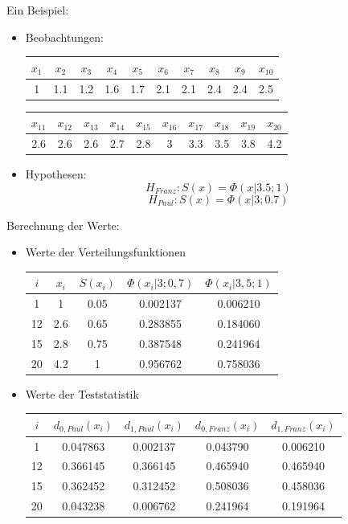 \documentclass{beamer}
\begin{document}
\begin{frame}{\insertsubsection}
Ein Beispiel:\\
	\begin{itemize}
		\item Beobachtungen:
			\begin{table}[h]
			\center
			\begin{tabular}{c|c|c|c|c|c|c|c|c|c}
			$x_1$	&$x_2$	&$x_3$	&$x_4$	&$x_5$	&$x_6$	&$x_7$	&$x_8$	&$x_9$	&$x_{10}$\\
			\hline
			1	&1.1	&1.2	&1.6	&1.7	&2.1	&2.1	&2.4	&2.4	&2.5	\\
			\end{tabular}
			\begin{tabular}{c|c|c|c|c|c|c|c|c|c}
			$x_{11}$	&$x_{12}$	&$x_{13}$	&$x_{14}$	&$x_{15}$	&$x_{16}$	&$x_{17}$	&$x_{18}$	&$x_{19}$	&$x_{20}$\\
			\hline
			2.6	&2.6	&2.6	&2.7	&2.8	&3	&3.3	&3.5	&3.8	&4.2\\
			\end{tabular}
			\end{table}
		\item Hypothesen: $$H_{Franz}:S(x)=\Phi(x|3.5;1)$$ $$H_{Paul}:S(x)=\Phi(x|3;0.7)$$
	\end{itemize}
\end{frame}

\begin{frame}{\insertsubsection}
Berechnung der Werte:\\
	\begin{itemize}
		\item Werte der Verteilungsfunktionen
			\begin{table}[ht]
			\center
			\begin{tabular}{c|c|c|c|c}
			$i$ 	& $x_i$ 	& $S(x_i)$ 	& $\Phi (x_i|3;0,7)$ 	& $\Phi (x_i|3,5;1)$ 	\\
			\hline
			1	&	1	&	0.05	&	0.002137	&	0.006210	\\
			12	&	2.6	&	0.65	&	0.283855	&	0.184060	\\
			15	&	2.8	&	0.75	&	0.387548	&	0.241964	\\
			20	&	4.2	&	1	&	0.956762	&	0.758036	\\
			\end{tabular}
			\end{table}
		\item Werte der Teststatistik
			\begin{table}[ht]
			\center
			\begin{tabular}{c|c|c|c|c}
			$i$ 	& $d_{0,Paul}(x_i)$ 	& $d_{1,Paul}(x_i)$ 	& $d_{0,Franz}(x_i)$ 	& $d_{1,Franz}(x_i)$ 	\\
			\hline
			1	&	0.047863	&	0.002137	&	0.043790	&	0.006210	\\
			12	&	0.366145	&	0.366145	&	0.465940	&	0.465940	\\
			15	&	0.362452	&	0.312452	&	0.508036	&	0.458036	\\
			20	&	0.043238	&	0.006762	&	0.241964	&	0.191964	\\
			\end{tabular}
			\end{table}
	\end{itemize}
\end{frame}
\end{document}
